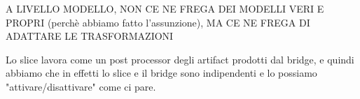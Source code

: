 A LIVELLO MODELLO, NON CE NE FREGA DEI MODELLI VERI E PROPRI (perchè abbiamo fatto l'assunzione), MA CE NE FREGA DI ADATTARE LE TRASFORMAZIONI


Lo slice lavora come un post processor degli artifact prodotti dal bridge, e quindi abbiamo che in effetti lo slice e il bridge sono indipendenti e lo possiamo "attivare/disattivare" come ci pare.